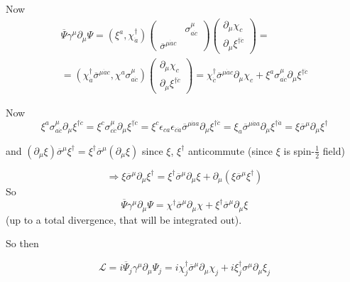 \documentclass[twoside]{amsart}
\begin{document}
\begin{itemize}
Now 
\[
\begin{gathered}
  \overline{\Psi} \gamma^{\mu} \partial_{\mu} \Psi = ( \xi^a, \chi_{\dot{a}}^{\dag} ) \left( \begin{matrix} & \sigma^{\mu}_{a\dot{c}} \\ \overline{\sigma}^{\mu \dot{a} c} & \end{matrix} \right) \left( \begin{matrix} \partial_{\mu} \chi_{c} \\ \partial_{\mu} \xi^{\dag \dot{c}} \end{matrix} \right) =  \\
    = (\chi_{\dot{a}}^{\dag} \overline{\sigma}^{\mu \dot{a} c} , \chi^a \sigma^{\mu}_{a\dot{c}} ) \left( \begin{matrix} \partial_{\mu} \chi_c \\ \partial_{\mu} \xi^{\dag \dot{c}} \end{matrix} \right) = \chi^{\dag}_{\dot{c}} \overline{\sigma}^{\mu \dot{a} c} \partial_{\mu} \chi_c + \xi^a \sigma^{\mu}_{a\dot{c} } \partial_{\mu} \xi^{\dag \dot{c}}
\end{gathered}
\]

Now 
\[
\xi^a \sigma^{\mu}_{a\dot{c}} \partial_{\mu} \xi^{\dag \dot{c}} = \xi^c \sigma^{\mu}_{c\dot{c}} \partial_{\mu} \xi^{\dag \dot{c}} = \xi^c \epsilon_{ca} \epsilon_{\dot{c} \dot{a}} \overline{\sigma}^{\mu \dot{a} a} \partial_{\mu} \xi^{\dag \dot{c}} = \xi_a \overline{\sigma}^{\mu \dot{a} a} \partial_{\mu} \xi^{\dag \dot{a}} = \xi \overline{\sigma}^{\mu} \partial_{\mu} \xi^{\dag}
\]

and $(\partial_{\mu} \xi) \overline{\sigma}^{\mu} \xi^{\dag} = \xi^{\dag} \overline{\sigma}^{\mu} (\partial_{\mu} \xi)$ since $\xi$, $\xi^{\dag}$ anticommute (since $\xi$ is spin-$\frac{1}{2}$ field)

\[
\Longrightarrow \xi \overline{\sigma}^{\mu} \partial_{\mu} \xi^{\dag} = \xi^{\dag} \overline{\sigma}^{\mu} \partial_{\mu} \xi + \partial_{\mu} (\xi \overline{\sigma}^{\mu} \xi^{\dag} )
\]
So
\[
\overline{\Psi} \gamma^{\mu} \partial_{\mu} \Psi = \chi^{\dag} \overline{\sigma}^{\mu} \partial_{\mu} \chi + \xi^{\dag} \overline{\sigma}^{\mu} \partial_{\mu} \xi 
\]
(up to a total divergence, that will be integrated out).  

So then

\[
\mathcal{L} = i \overline{\Psi}_j \gamma^{\mu} \partial_{\mu} \Psi_j = i \chi^{\dag}_j \overline{\sigma}^{\mu} \partial_{\mu} \chi_j + i \xi^{\dag}_j \sigma^{\mu} \partial_{\mu} \xi_j
\]


\end{itemize}
\end{document}
